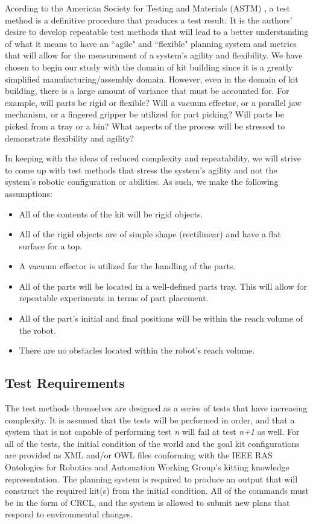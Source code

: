 Acording to the American Society for Testing and Materials (ASTM) \cite[p. vii]{ASTM99}, a test method is a
definitive procedure that produces a test result. It is the authors' desire to develop repeatable test methods that will
lead to a better understanding of what it means to have an ``agile" and ``flexible" planning system and metrics that 
will allow for the measurement of a system's agility and flexibility. We have chosen to begin our study
with the domain of kit building since it is a greatly simplified manufacturing/assembly domain. However, 
even in the domain of kit building, there is a large amount of variance that must be accounted for. For
example, will parts be rigid or flexible? Will a vacuum effector, or a parallel jaw mechanism, or a fingered 
gripper be utilized for part picking? Will parts be picked from a tray or a bin? What aspects of the
process will be stressed to demonstrate flexibility and agility?

In keeping with the ideas of reduced complexity and repeatability, we will strive to come up with test methods that stress
the system's agility and not the system's robotic configuration or abilities. As such, we make the following assumptions:
\begin{itemize}
	\item All of the contents of the kit will be rigid objects.
	\item All of the rigid objects are of simple shape (rectilinear) and have a flat surface for a top.
	\item A vacuum effector is utilized for the handling of the parts.
	\item All of the parts will be located in a well-defined parts tray. This will allow for repeatable experiments in terms of part placement.
	\item All of the part's initial and final positions will be within the reach volume of the robot.
	\item There are no obstacles located within the robot's reach volume.
\end{itemize}

\subsection{Test Requirements}
The test methods themselves are designed as a series of tests that have increasing complexity. It is assumed that the tests will be performed
in order, and that a system that is not capable of performing test {\it n} will fail at test {\it n+1} as well. For all of the tests,
the initial condition of the world and the goal kit configurations are provided as XML and/or OWL files conforming with the IEEE RAS Ontologies
for Robotics and Automation Working Group's kitting knowledge representation. The planning system is required to produce an output that
will construct the required kit(s) from the initial condition. All of the commands must be in the form of CRCL, and the system
is allowed to submit new plans that respond to environmental changes.

